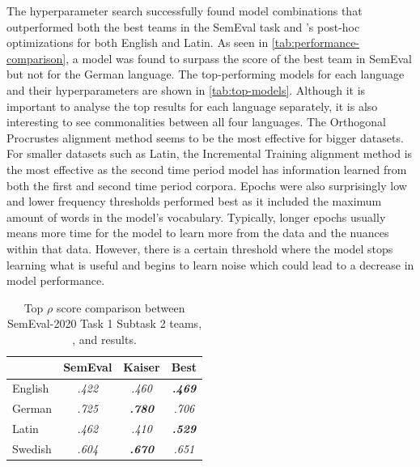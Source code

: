 The hyperparameter search successfully found model combinations that outperformed both the best teams in the SemEval task and \citet{kaiser-etal-2020-ims}’s post-hoc optimizations for both English and Latin. As seen in \autoref{tab:performance-comparison}, a model was found to surpass the score of the best team in SemEval but not \citet{kaiser-etal-2020-ims} for the German language. The top-performing models for each language and their hyperparameters are shown in \autoref{tab:top-models}. Although it is important to analyse the top results for each language separately, it is also interesting to see commonalities between all four languages. The Orthogonal Procrustes alignment method seems to be the most effective for bigger datasets. For smaller datasets such as Latin, the Incremental Training alignment method is the most effective as the second time period model has information learned from both the first and second time period corpora. Epochs were also surprisingly low and lower frequency thresholds performed best as it included the maximum amount of words in the model’s vocabulary. Typically, longer epochs usually means more time for the model to learn more from the data and the nuances within that data. However, there is a certain threshold where the model stops learning what is useful and begins to  learn noise which could lead to a decrease in model performance. 

\begin{table}
\centering
\begin{tabular}{|l|c|c|c|} 
\cline{2-4}
\multicolumn{1}{l|}{\textbf{ }} & \textbf{SemEval } & \textbf{Kaiser }         & \textbf{Best }            \\ 
\hline
English                         & \textit{ .422 }   & \textit{ .460 }          & \textbf{\textit{ .469 }}  \\ 
\hline
German                          & \textit{ .725 }   & \textit{\textbf{ .780 }} & \textit{ .706 }           \\ 
\hline
Latin                           & \textit{ .462 }   & \textit{ .410 }          & \textbf{\textit{ .529 }}  \\ 
\hline
Swedish                         & \textit{ .604 }   & \textit{\textbf{ .670 }} & \textit{ .651 }           \\
\hline
\end{tabular}
\caption{Top $\rho$ score comparison between SemEval-2020 Task 1 Subtask 2 teams, \citet{kaiser-etal-2020-ims}, and results.}
\label{tab:performance-comparison}
\end{table}


